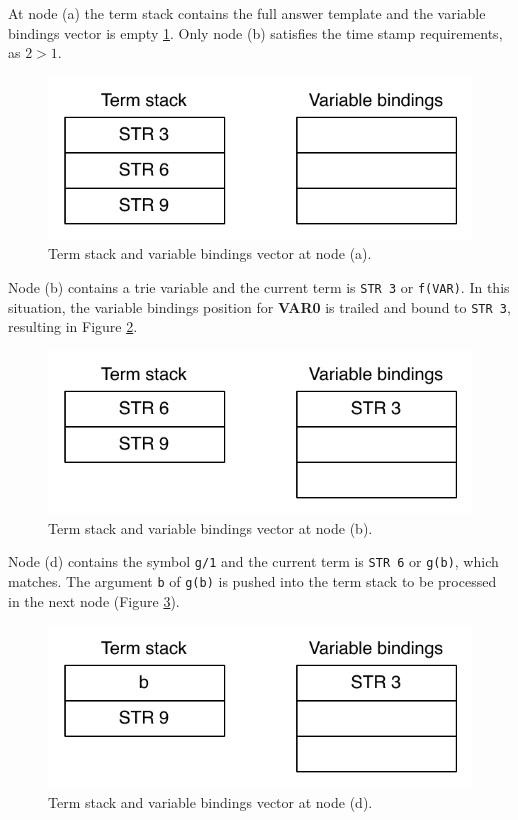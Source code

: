 At node (a) the term stack contains the full answer template and the variable bindings vector
is empty \ref{fig:collect_functor1}. Only node (b) satisfies the time stamp requirements,
as $2 > 1$.

\begin{figure}[H]
  \centering
    \includegraphics[scale=0.6]{collect_functor1.pdf}
  \caption{Term stack and variable bindings vector at node (a).}
  \label{fig:collect_functor1}
\end{figure}

Node (b) contains a trie variable and the current term is \texttt{STR 3} or \texttt{f(VAR)}.
In this situation, the variable bindings position for \textbf{VAR0} is trailed and bound to \texttt{STR 3},
resulting in Figure \ref{fig:collect_functor2}.

\begin{figure}[H]
  \centering
    \includegraphics[scale=0.6]{collect_functor2.pdf}
  \caption{Term stack and variable bindings vector at node (b).}
  \label{fig:collect_functor2}
\end{figure}

Node (d) contains the symbol \texttt{g/1} and the current term is \texttt{STR 6}
or \texttt{g(b)}, which matches. The argument \texttt{b} of \texttt{g(b)}
is pushed into the term stack to be processed in the next node (Figure \ref{fig:collect_functor3}).

\begin{figure}[H]
  \centering
    \includegraphics[scale=0.6]{collect_functor3.pdf}
  \caption{Term stack and variable bindings vector at node (d).}
  \label{fig:collect_functor3}
\end{figure}

